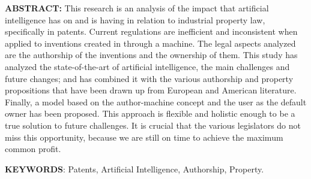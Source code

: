 \documentclass[12pt]{article}
\renewcommand{\_}{\kern-1.5pt\textunderscore\kern-1.5pt}
\begin{document}
\vspace{\baselineskip}
\par


\vspace{\baselineskip}

\vspace{\baselineskip}

\vspace{\baselineskip}

\vspace{\baselineskip}
\begin{justify}
\textbf{ABSTRACT:} This research is an analysis of the impact that artificial intelligence has on and is having in relation to industrial property law, specifically in patents. Current regulations are inefficient and inconsistent when applied to inventions created in through a machine. The legal aspects analyzed are the authorship of the inventions and the ownership of them. This study has analyzed the state-of-the-art of artificial intelligence, the main challenges and future changes; and has combined it with the various authorship and property propositions that have been drawn up from European and American literature. Finally, a model based on the author-machine concept and the user as the default owner has been proposed. This approach is flexible and holistic enough to be a true solution to future challenges. It is crucial that the various legislators do not miss this opportunity, because we are still on time to achieve the maximum common profit. 
\end{justify}\par


\vspace{\baselineskip}

\vspace{\baselineskip}
\begin{justify}
{\fontsize{10pt}{12.0pt}\selectfont \textbf{KEYWORDS}: Patents, Artificial Intelligence, Authorship, Property. \par}
\end{justify}\par


\vspace{\baselineskip}
\end{document}
